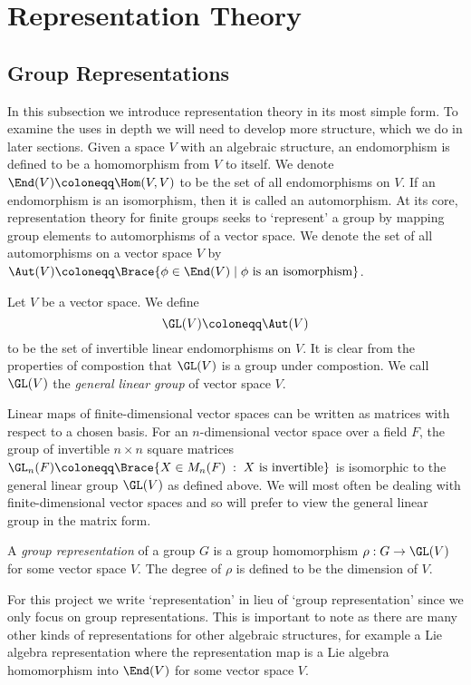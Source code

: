 \documentclass[../Project.tex]{subfiles}
\begin{document}
\newpage
\section{Representation Theory}
\subsection{Group Representations}
In this subsection we introduce representation theory in its most simple form. To examine the uses in depth we will need to develop more structure, which we do in later sections. Given a space $V$ with an algebraic structure, an endomorphism is defined to be a homomorphism from $V$ to itself. We denote $\End(V) \coloneqq \Hom(V,V)$ to be the set of all endomorphisms on $V$. If an endomorphism is an isomorphism, then it is called an automorphism. At its core, representation theory for finite groups seeks to `represent' a group by mapping group elements to automorphisms of a vector space. We denote the set of all automorphisms on a vector space $V$ by $\Aut(V) \coloneqq \Brace{\phi \in \End(V)\;|\;\phi \text{ is an isomorphism}}$.

\begin{defi}
	Let $V$ be a vector space. We define
	$$\GL(V) \coloneqq \Aut(V)$$
	to be the set of invertible linear endomorphisms on $V$. It is clear from the properties of compostion that $\GL(V)$ is a group under compostion. We call $\GL(V)$ the \textit{general linear group} of vector space $V$.\label{1}
\end{defi}

Linear maps of finite-dimensional vector spaces can be written as matrices with respect to a chosen basis. For an $n$-dimensional vector space over a field $F$, the group of invertible $n\times n$ square matrices $\GL_n(F) \coloneqq \Brace{X \in M_n(F) \;:\; X \text{ is invertible}}$ is isomorphic to the general linear group $\GL(V)$ as defined above. We will most often be dealing with finite-dimensional vector spaces and so will prefer to view the general linear group in the matrix form.

\begin{defi}
	A \textit{group representation} of a group $G$ is a group homomorphism $\rho : G \to \GL(V)$ for some vector space $V$. The degree of $\rho$ is defined to be the dimension of $V$.
\end{defi}

For this project we write `representation' in lieu of `group representation' since we only focus on group representations. This is important to note as there are many other kinds of representations for other algebraic structures, for example a Lie algebra representation where the representation map is a Lie algebra homomorphism into $\End(V)$ for some vector space $V$.\\
\end{document}
